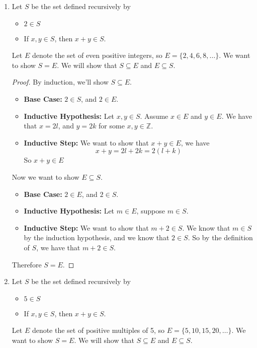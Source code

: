 \documentclass[openany]{report}
\begin{document}
\begin{enumerate}[label=(\alph*)]
    \item Let $S$ be the set defined recursively by
    \begin{itemize}
        \item $2 \in S$
        \item If $x,y \in S$, then $x + y \in S$.
    \end{itemize}
    Let $E$ denote the set of even positive integers, so $E = \{2,4,6,8,\ldots\}$. We want to show $S = E$. We will show that $S \subseteq E$ and $E \subseteq S$. 
    \begin{proof}
        By induction, we'll show $S \subseteq E$. 
        \begin{itemize}
            \item \textbf{Base Case:} $2 \in S$, and $2 \in E$.
            \item \textbf{Inductive Hypothesis:} Let $x,y \in S$. Assume $x \in E$ and $y \in E$. We have that $x = 2l$, and $y = 2k$ for some $x,y \in \mathbb{Z}$.
            \item \textbf{Inductive Step:} We want to show that $x+y \in E$, we have 
            \[x + y = 2l + 2k = 2(l + k)\]
            So $x + y \in E$ 
        \end{itemize}
        Now we want to show $E \subseteq S$. 
        \begin{itemize}
            \item \textbf{Base Case:} $2 \in E$, and $2 \in S$.
            \item \textbf{Inductive Hypothesis:} Let $m \in E$, suppose $m \in S$.
            \item \textbf{Inductive Step:} We want to show that $m + 2 \in S$. We know that $m \in S$ by the induction hypothesis, and we know that $2 \in S$. So by the definition of $S$, we have that $m + 2 \in S$.
        \end{itemize}
        Therefore $S = E$. 
    \end{proof}
    \item Let $S$ be the set defined recursively by
    \begin{itemize}
        \item $5 \in S$
        \item If $x,y \in S$, then $x + y \in S$.
    \end{itemize}
    Let $E$ denote the set of positive multiples of 5, so $E = \{5,10,15,20,\ldots\}$. We want to show $S = E$. We will show that $S \subseteq E$ and $E \subseteq S$.

\end{enumerate}
\end{document}
